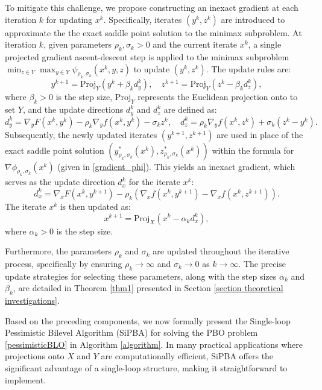 \documentclass{article}
\begin{document}
To mitigate this challenge, we propose constructing an inexact gradient at each iteration $k$ for updating $x^k$. Specifically, iterates $(y^k, z^k)$ are introduced to approximate the the exact saddle point solution to the minimax subproblem. At iteration $k$, given parameters $\rho_k, \sigma_k >0$ and the current iterate $x^k$, a single projected gradient ascent-descent step is applied to the minimax subproblem $\min_{z\in {Y}} \max_{ y \in {Y}}\psi_{\rho_k, \sigma_k }(x^k, y, z)$ to update $(y^k, z^k)$. The update rules are:
\[
y^{k+1} = \mathrm{Proj}_Y\left(y^k + \beta_k d_{y}^k \right), \quad z^{k+1} = \mathrm{Proj}_Y\left( z^k - \beta_k d_{z}^k \right),
\]
where $\beta_k > 0$ is the step size, $\mathrm{Proj}_Y$ represents the Euclidean projection onto to set $Y$, and the update directions $d_{y}^k$ and $d_{z}^k$ are defined as:
\begin{equation}\label{direction_yz}
    d_y^k = \nabla_y F(x^k,y^k) - \rho_k \nabla_y f(x^k,y^k) - \sigma_k z^k, \quad  d_z^k =  \rho_k \nabla_y f(x^k,z^k) + \sigma_k (z^k - y^k).
\end{equation}
Subsequently, the newly updated iterates $(y^{k+1}, z^{k+1})$ are used in place of the exact saddle point solution $(y_{\rho_k, \sigma_k}^*(x^k),z_{\rho_k, \sigma_k}^*(x^k))$ within the formula for $\nabla \phi_{\rho_k, \sigma_k}(x^k)$ (given in \eqref{gradient_phi}). This yields an inexact gradient, which serves as the update direction $d_x^k$ for the iterate $x^k$:
\begin{equation}\label{direction_x}
    d_x^k = \nabla_x F(x^k,y^{k+1}) - \rho_k \left(\nabla_x f(x^k,y^{k+1}) - \nabla_x f(x^k,z^{k+1})\right).
\end{equation}
The iterate $x^k$ is then updated as:
\[
x^{k+1} = \mathrm{Proj}_X\left(x^k - \alpha_k d_{x}^k \right),
\]
where $\alpha_k > 0$ is the step size. 

Furthermore, the parameters $\rho_k$ and $\sigma_k$ are updated throughout the iterative process, specifically by ensuring $\rho_k \rightarrow \infty$ and $\sigma_k \rightarrow 0$ as $k \rightarrow \infty$. The precise update strategies for selecting these parameters, along with the step sizes $\alpha_k$ and $\beta_k$, are detailed in Theorem \ref{thm1} presented in Section \ref{section theoretical investigations}.

Based on the preceding components, we now formally present the Single-loop Pessimistic Bilevel Algorithm (SiPBA) for solving the PBO problem \eqref{pessimisticBLO} in Algorithm \ref{algorithm}. In many practical applications where projections onto $X$ and $Y$ are computationally efficient, SiPBA offers the significant advantage of a single-loop structure, making it straightforward to implement.
\end{document}
